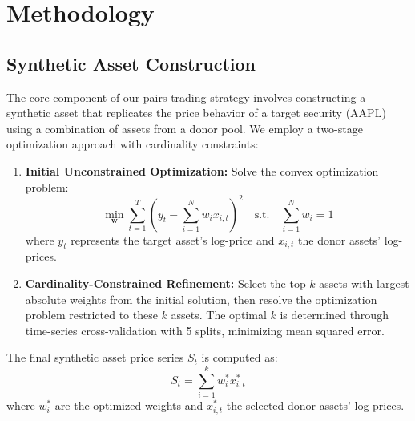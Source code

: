








\section{Methodology}
\label{sec:methodology}

\subsection{Synthetic Asset Construction}
The core component of our pairs trading strategy involves constructing a synthetic asset that replicates the price behavior of a target security (AAPL) using a combination of assets from a donor pool. We employ a two-stage optimization approach with cardinality constraints:

\begin{enumerate}
    \item \textbf{Initial Unconstrained Optimization:} Solve the convex optimization problem:
    \begin{equation}
        \min_{\mathbf{w}} \sum_{t=1}^T \left(y_t - \sum_{i=1}^N w_i x_{i,t}\right)^2 \quad \text{s.t.} \quad \sum_{i=1}^N w_i = 1
    \end{equation}
    where $ y_t $ represents the target asset's log-price and $ x_{i,t} $ the donor assets' log-prices.
    
    \item \textbf{Cardinality-Constrained Refinement:} Select the top $ k $ assets with largest absolute weights from the initial solution, then resolve the optimization problem restricted to these $ k $ assets. The optimal $ k $ is determined through time-series cross-validation with 5 splits, minimizing mean squared error.
\end{enumerate}

The final synthetic asset price series $ S_t $ is computed as:
\begin{equation}
    S_t = \sum_{i=1}^k w_i^* x_{i,t}^*
\end{equation}
where $ w_i^* $ are the optimized weights and $ x_{i,t}^* $ the selected donor assets' log-prices.

